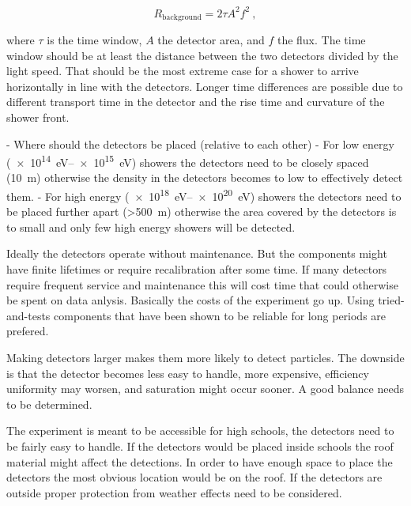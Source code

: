 \begin{equation}
    R_{\mathrm{background}} = 2 \tau A^2 f^2 \ ,
\end{equation}

where $\tau$ is the time window, $A$ the detector area, and $f$ the flux. The time window should be at least the distance between the two detectors divided by the light speed. That should be the most extreme case for a shower to arrive horizontally in line with the detectors. Longer time differences are possible due to different transport time in the detector and the rise time and curvature of the shower front.

- Where should the detectors be placed (relative to each other)
  - For low energy (\SIrange{e14}{e15}{\eV}) showers the detectors need to be closely spaced (\SI{10}{\meter}) otherwise the density in the detectors becomes to low to effectively detect them.
  - For high energy (\SIrange{e18}{e20}{\eV}) showers the detectors need to be placed further apart (\SI{>500}{\meter}) otherwise the area covered by the detectors is to small and only few high energy showers will be detected.

Ideally the detectors operate without maintenance. But the components might have finite lifetimes or require recalibration after some time. If many detectors require frequent service and maintenance this will cost time that could otherwise be spent on data anlysis. Basically the costs of the experiment go up. Using tried-and-tests components that have been shown to be reliable for long periods are prefered.

Making detectors larger makes them more likely to detect particles. The downside is that the detector becomes less easy to handle, more expensive, efficiency uniformity may worsen, and saturation might occur sooner. A good balance needs to be determined.

The experiment is meant to be accessible for high schools, the detectors need to be fairly easy to handle. If the detectors would be placed inside schools the roof material might affect the detections. In order to have enough space to place the detectors the most obvious location would be on the roof. If the detectors are outside proper protection from weather effects need to be considered.


